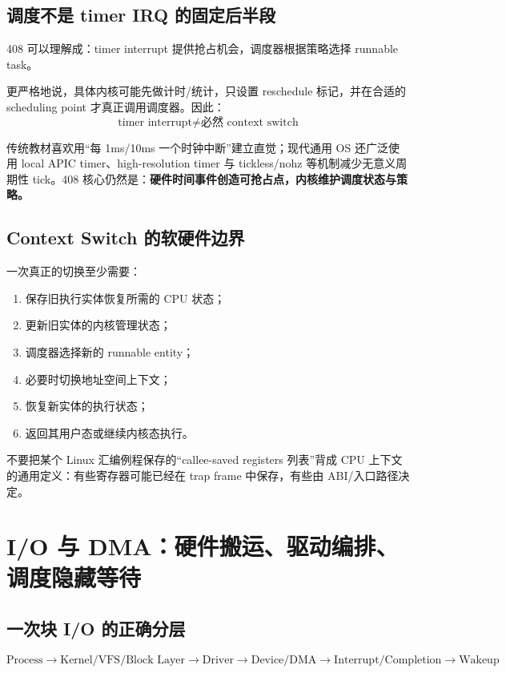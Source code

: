 \documentclass[11pt,a4paper]{ctexart}
\newcommand{\kw}[1]{\textbf{#1}}
\begin{document}
\subsection{调度不是 timer IRQ 的固定后半段}
408 可以理解成：timer interrupt 提供抢占机会，调度器根据策略选择 runnable task。

更严格地说，具体内核可能先做计时/统计，只设置 reschedule 标记，并在合适的 scheduling point 才真正调用调度器。因此：
\[
\boxed{\text{timer interrupt} \neq \text{必然 context switch}}
\]

\begin{eng}
传统教材喜欢用“每 1ms/10ms 一个时钟中断”建立直觉；现代通用 OS 还广泛使用 local APIC timer、high-resolution timer 与 tickless/nohz 等机制减少无意义周期性 tick。408 核心仍然是：\kw{硬件时间事件创造可抢占点，内核维护调度状态与策略。}
\end{eng}

\subsection{Context Switch 的软硬件边界}
一次真正的切换至少需要：
\begin{enumerate}
  \item 保存旧执行实体恢复所需的 CPU 状态；
  \item 更新旧实体的内核管理状态；
  \item 调度器选择新的 runnable entity；
  \item 必要时切换地址空间上下文；
  \item 恢复新实体的执行状态；
  \item 返回其用户态或继续内核态执行。
\end{enumerate}

不要把某个 Linux 汇编例程保存的“callee-saved registers 列表”背成 CPU 上下文的通用定义：有些寄存器可能已经在 trap frame 中保存，有些由 ABI/入口路径决定。

\section{I/O 与 DMA：硬件搬运、驱动编排、调度隐藏等待}

\subsection{一次块 I/O 的正确分层}
\[
\boxed{
\text{Process}
\rightarrow
\text{Kernel/VFS/Block Layer}
\rightarrow
\text{Driver}
\rightarrow
\text{Device/DMA}
\rightarrow
\text{Interrupt/Completion}
\rightarrow
\text{Wakeup}
}
\]
\end{document}
